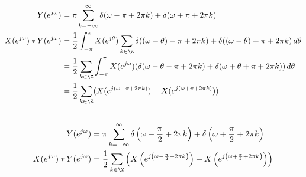 \documentclass{article}
\begin{document}
\begin{align}
    Y(e^{j \omega}) &= \pi \sum_{k = -\infty}^\infty \delta(\omega - \pi + 2\pi k) + \delta(\omega + \pi + 2\pi k) \\
    X(e^{j \omega}) \ast Y(e^{j \omega}) &= \frac{1}{2} \int_{-\pi}^\pi X(e^{j \theta}) \sum_{k \in \Z} \delta((\omega - \theta) - \pi + 2\pi k) + \delta((\omega - \theta) + \pi + 2\pi k) \, d\theta \\
    &= \frac{1}{2} \sum_{k \in \Z} \int_{-\pi}^\pi X(e^{j \omega}) (\delta(\omega - \theta - \pi + 2\pi k) + \delta(\omega + \theta + \pi + 2\pi k)) \, d\theta \\
    &= \frac{1}{2} \sum_{k \in \Z} (X(e^{j (\omega - \pi + 2\pi k)}) + X(e^{j (\omega + \pi + 2\pi k)}))
\end{align}
\begin{center}
\end{center}

\subsection{}

\begin{align}
    Y(e^{j \omega}) &= \pi \sum_{k = -\infty}^\infty \delta\left(\omega - \frac{\pi}{2} + 2\pi k\right) + \delta\left(\omega + \frac{\pi}{2} + 2\pi k\right) \\
    X(e^{j \omega}) \ast Y(e^{j \omega}) &= \frac{1}{2} \sum_{k \in \Z} \left(X\left(e^{j \left(\omega - \frac{\pi}{2} + 2\pi k\right)}\right) + X\left(e^{j \left(\omega + \frac{\pi}{2} + 2\pi k\right)}\right)\right)
\end{align}
\begin{center}
\end{center}
\end{document}
